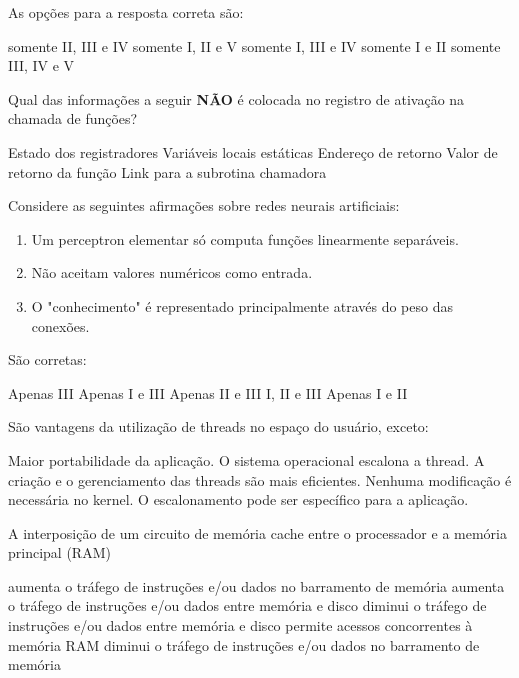 \documentclass[12pt, addpoints]{exam}
\begin{document}
\begin{questions}
As opções para a resposta correta são:
\begin{choices}
\choice somente II, III e IV
\choice somente I, II e V
\choice somente I, III e IV
\choice somente I e II
\choice somente III, IV e V
\end{choices}

\question
Qual das informações a seguir \textbf{NÃO} é colocada no registro de ativação na chamada de funções?

\begin{choices}
\choice Estado dos registradores
\choice Variáveis locais estáticas
\choice Endereço de retorno
\choice Valor de retorno da função
\choice Link para a subrotina chamadora
\end{choices}

\question
Considere as seguintes afirmações sobre redes neurais artificiais: \begin{enumerate}[label=\Roman*.] \item Um perceptron elementar só computa funções linearmente separáveis. \item Não aceitam valores numéricos como entrada. \item O "conhecimento" é representado principalmente através do peso das conexões. \end{enumerate} São corretas:
\begin{choices}
\choice Apenas III
\choice Apenas I e III
\choice Apenas II e III
\choice I, II e III
\choice Apenas I e II 
\end{choices}

\question
São vantagens da utilização de threads no espaço do usuário, exceto:
\begin{choices}
\choice Maior portabilidade da aplicação.
\choice O sistema operacional escalona a thread.
\choice A criação e o gerenciamento das threads são mais eficientes.
\choice Nenhuma modificação é necessária no kernel.
\choice O escalonamento pode ser específico para a aplicação.
\end{choices}

\question
A interposição de um circuito de memória cache entre o processador e a memória principal (RAM)
\begin{choices}
\choice aumenta o tráfego de instruções e/ou dados no barramento de memória
\choice aumenta o tráfego de instruções e/ou dados entre memória e disco
\choice diminui o tráfego de instruções e/ou dados entre memória e disco
\choice permite acessos concorrentes à memória RAM
\choice diminui o tráfego de instruções e/ou dados no barramento de memória
\end{choices}


\end{questions}
\end{document}
